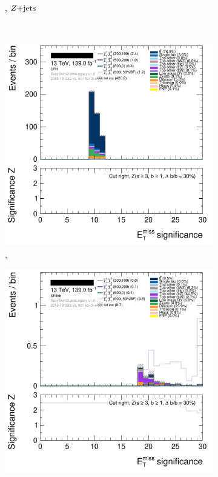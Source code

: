 \begin{figure}[tp]
\begin{subfigure}{0.48\textwidth}
\caption{\crz, $Z\mathrm{+jets}$}
\label{fig:2ljets_splits_zjets}
\end{subfigure}
\\[0.5em]
\begin{subfigure}{0.48\textwidth}
\centering
\includegraphics[width=\textwidth]{figures/2ljets_splits_met_Sign_CRtt.png}
\caption{\crtt, \topother}
\label{fig:2ljets_splits_topother1}
\end{subfigure}
\hfill
\begin{subfigure}{0.48\textwidth}
\centering
\includegraphics[width=\textwidth]{figures/2ljets_splits_met_Sign_SRllbb.png}

\end{subfigure}
\end{figure}
